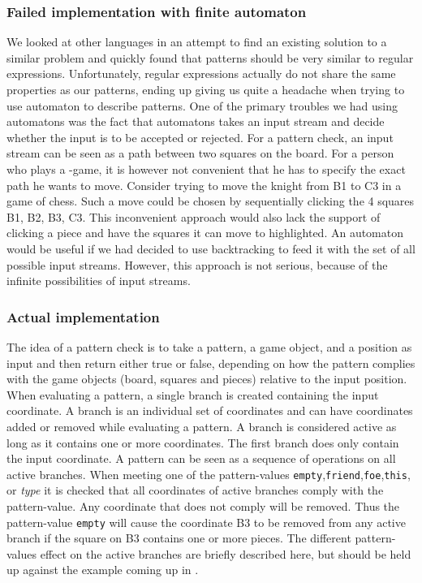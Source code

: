 \subsubsection{Failed implementation with finite automaton}
We looked at other languages in an attempt to find an existing solution
to a similar problem and quickly found that patterns should be very
similar to regular expressions. Unfortunately, regular expressions
actually do not share the same properties as our patterns, ending up
giving us quite a headache when trying to use automaton to describe
patterns. One of the primary troubles we had using automatons was the fact 
that automatons takes an input stream and decide whether the input is to be accepted 
or rejected. For a pattern check, an input stream can be seen as a path 
between two squares on the board. For a person who plays a \productname{}-game, it is however 
not convenient that he has to specify the exact path he wants to move. Consider trying to move the 
knight from B1 to C3 in a game of chess. Such a move could be chosen by 
sequentially clicking the 4 squares  B1, B2, B3, C3. This inconvenient approach 
would also lack the support of clicking a piece and have the squares it can 
move to highlighted. An automaton would be useful if we had decided to use backtracking 
to feed it with the set of all possible input streams. However, this approach is 
not serious, because of the infinite possibilities of input streams. 

\subsubsection{Actual implementation}
The idea of a pattern check is to take a pattern, a game object, and a position as input and then return either true or false, depending on how the pattern complies with the game objects (board, squares and pieces) relative to the input position.
When evaluating a pattern, a single branch is created containing the input coordinate. A branch is an individual set of coordinates and can have coordinates added or removed while evaluating a pattern. A branch is considered active as long as it contains one or more coordinates. The first branch does only contain the input coordinate. A pattern can be seen as a sequence of operations on all active branches.
When meeting one of the pattern-values \texttt{empty},\texttt{friend},\texttt{foe},\texttt{this}, or \textit{type} it is checked that all coordinates of active branches comply with the pattern-value. Any coordinate that does not comply will be removed. Thus the pattern-value \texttt{empty} will cause the coordinate B3 to be removed from any active branch if the square on B3 contains one or more pieces. The different pattern-values effect on the active branches are briefly described here, but should be held up against the example coming up in .

